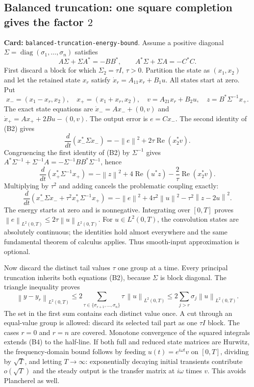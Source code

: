 \documentclass[11pt,a4paper]{article}
\newcommand{\norm}[1]{\left\lVert#1\right\rVert}
\DeclareMathOperator{\diag}{diag}
\DeclareRobustCommand{\code}[1]{{\footnotesize\urlstyle{tt}\nolinkurl{#1}}}
\begin{document}
\subsection{Balanced truncation: one square completion gives the factor $2$}
\label{route:balanced-truncation-energy-bound}
\textbf{Card:} \code{balanced-truncation-energy-bound}.
Assume a positive diagonal $\Sigma=\diag(\sigma_1,\ldots,\sigma_n)$ satisfies
\[
 A\Sigma+\Sigma A^*=-BB^*,\qquad
 A^*\Sigma+\Sigma A=-C^*C. \tag{B2}
\]
First discard a block for which $\Sigma_2=\tau I$, $\tau>0$.
Partition the state as $(x_1,x_2)$ and let the retained state $x_r$ satisfy
$\dot x_r=A_{11}x_r+B_1u$. All states start at zero. Put
\[
 x_-=(x_1-x_r,x_2),\quad x_+=(x_1+x_r,x_2),\quad
 v=A_{21}x_r+B_2u,\quad z=B^*\Sigma^{-1}x_+.
\]
The exact state equations are
$\dot x_-=Ax_-+(0,v)$ and $\dot x_+=Ax_++2Bu-(0,v)$.
The output error is $e=Cx_-$. The second identity of (B2) gives
\[
 \frac d{dt}(x_-^*\Sigma x_-)=-\norm e^2+2\tau\operatorname{Re}(x_2^*v).
\]
Congruencing the first identity of (B2) by $\Sigma^{-1}$ gives
$A^*\Sigma^{-1}+\Sigma^{-1}A=-\Sigma^{-1}BB^*\Sigma^{-1}$, hence
\[
 \frac d{dt}(x_+^*\Sigma^{-1}x_+)
 =-\norm z^2+4\operatorname{Re}(u^*z)
                  -\frac2\tau\operatorname{Re}(x_2^*v).
\]
Multiplying by $\tau^2$ and adding cancels the problematic coupling exactly:
\[
 \frac d{dt}\left(x_-^*\Sigma x_-+\tau^2x_+^*\Sigma^{-1}x_+\right)
 =-\norm e^2+4\tau^2\norm u^2-\tau^2\norm{z-2u}^2. \tag{B3}
\]
The energy starts at zero and is nonnegative. Integrating over $[0,T]$
proves $\norm e_{L^2(0,T)}\le2\tau\norm u_{L^2(0,T)}$.
For $u\in L^2(0,T)$, the convolution states are absolutely continuous;
the identities hold almost everywhere and the same fundamental theorem
of calculus applies. Thus smooth-input approximation is optional.

Now discard the distinct tail values $\tau$ one group at a time. Every
principal truncation inherits both equations (B2), because $\Sigma$ is
block diagonal. The triangle inequality proves
\[
 \boxed{\norm{y-y_r}_{L^2(0,T)}
 \le2\!\sum_{\tau\in\{\sigma_{r+1},\ldots,\sigma_n\}}\!\tau\,
                       \norm u_{L^2(0,T)}
 \le2\sum_{j>r}\sigma_j\norm u_{L^2(0,T)}.} \tag{B4}
\]
The set in the first sum contains each distinct value once. A cut through
an equal-value group is allowed: discard its selected tail part as one
$\tau I$ block. The cases $r=0$ and $r=n$ are covered.
Monotone convergence of the squared integrals extends (B4) to the half-line.
If both full and reduced state matrices are Hurwitz, the frequency-domain
bound follows by feeding $u(t)=e^{i\omega t}v$ on $[0,T]$, dividing by
$\sqrt T$, and letting $T\to\infty$: exponentially decaying initial
transients contribute $o(\sqrt T)$ and the steady output is the transfer
matrix at $i\omega$ times $v$. This avoids Plancherel as well.
\end{document}
